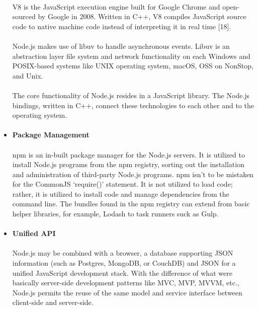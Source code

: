 \documentclass[thesis.tex]{subfiles}
\begin{document}
\begin{itemize}
    \paragraph{}
    V8 is the JavaScript execution engine built for Google Chrome and open-sourced by Google in 2008. Written in C++, V8 compiles JavaScript source code to native machine code instead of interpreting it in real time [18].
    \paragraph{}
    Node.js makes use of libuv to handle asynchronous events. Libuv is an abstraction layer file system and network functionality on each Windows and POSIX-based systems like UNIX operating system, macOS, OSS on NonStop, and Unix.
    \paragraph{}
    The core functionality of Node.js resides in a JavaScript library. The Node.js bindings, written in C++, connect these technologies to each other and to the operating system.
    \paragraph{}
    \item \textbf{Package Management}
    \paragraph{}
    npm is an in-built package manager for the Node.js servers. It is utilized to install Node.js programs from the npm registry, sorting out the installation and administration of third-party Node.js programs. npm isn't to be mistaken for the CommonJS ‘require()’ statement. It is not utilized to load code; rather, it is utilized to install code and manage dependencies from the command line. The bundles found in the npm registry can extend from basic helper libraries, for example, Lodash to task runners suck as Gulp.
    \paragraph{}
    \item \textbf{Unified API}
    \paragraph{}
    Node.js may be combined with a browser, a database supporting JSON information (such as Postgres, MongoDB, or CouchDB) and JSON for a unified JavaScript development stack. With the difference of what were basically server-side development patterns like MVC, MVP, MVVM, etc., Node.js permits the reuse of the same model and service interface between client-side and server-side.

\end{itemize}
\end{document}
